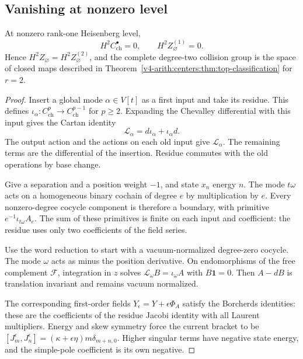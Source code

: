 \subsection{Vanishing at nonzero level}
\label{v4-arith:centers:subsec:heis-rigidity}

\begin{theorem}\label{v4-arith:centers:thm:heis-two}
At nonzero rank-one
Heisenberg level,
\[
 H^2C^\bullet_{\mathrm{ch}}=0,\qquad
 H^2Z_\varnothing^{(1)}=0.
\]
Hence
$H^2Z_\varnothing=H^2Z_\varnothing^{(2)}$,
and the complete
degree-two collision
group is the space
of closed maps
described in
Theorem~\ref{v4-arith:centers:thm:top-classification}
for $r=2$.
\end{theorem}

\begin{proof}
Insert a global mode
$\alpha\in V[t]$
as a first input
and take its residue.
This defines
$\iota_\alpha:C^p_{\mathrm{ch}}\to
C^{p-1}_{\mathrm{ch}}$
for $p\geq2$.
Expanding the Chevalley
differential with this
input gives the
Cartan identity
\[
 \mathcal L_\alpha
 =d\iota_\alpha+\iota_\alpha d.
\]
The output action and
the actions on each
old input give
$\mathcal L_\alpha$.
The remaining terms
are the differential
of the insertion.
Residue commutes with
the old operations
by base change.

Give a separation
and a position weight
$-1$, and state
$x_n$ energy $n$.
The mode $t\omega$
acts on a homogeneous
binary cochain of
degree $e$ by
multiplication by $e$.
Every nonzero-degree
cocycle component
is therefore a
boundary, with
primitive
$e^{-1}\iota_{t\omega}A_e$.
The sum of these
primitives is finite
on each input and
coefficient: the
residue uses only
two coefficients
of the field series.

Use the word reduction
to start with a
vacuum-normalized
degree-zero cocycle.
The mode $\omega$
acts as minus the
position derivative.
On endomorphisms of
the free complement
$\mathscr F$, integration
in $z$ solves
$\mathcal L_\omega B=\iota_\omega A$
with $B\mathbf1=0$.
Then $A-dB$ is
translation invariant
and remains vacuum
normalized.

The corresponding
first-order fields
$Y_\epsilon=Y+\epsilon\Phi_A$
satisfy the Borcherds
identities: these
are the coefficients
of the residue
Jacobi identity with
all Laurent multipliers.
Energy and skew
symmetry force the
current bracket to
be
$[J^\epsilon_m,J^\epsilon_n]
=(\kappa+\epsilon\eta)m\delta_{m+n,0}$.
Higher singular terms
have negative state
energy, and the
simple-pole coefficient
is its own negative.


\end{proof}
